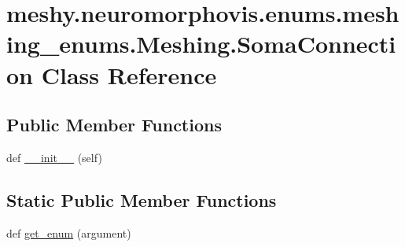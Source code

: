 \hypertarget{classmeshy_1_1neuromorphovis_1_1enums_1_1meshing__enums_1_1Meshing_1_1SomaConnection}{}\section{meshy.\+neuromorphovis.\+enums.\+meshing\+\_\+enums.\+Meshing.\+Soma\+Connection Class Reference}
\label{classmeshy_1_1neuromorphovis_1_1enums_1_1meshing__enums_1_1Meshing_1_1SomaConnection}


 


\subsection*{Public Member Functions}
\begin{DoxyCompactItemize}
\item 
def \hyperlink{classmeshy_1_1neuromorphovis_1_1enums_1_1meshing__enums_1_1Meshing_1_1SomaConnection_afaf187acb838fdda4a038bfe232c79a8}{\+\_\+\+\_\+init\+\_\+\+\_\+} (self)\hypertarget{classmeshy_1_1neuromorphovis_1_1enums_1_1meshing__enums_1_1Meshing_1_1SomaConnection_afaf187acb838fdda4a038bfe232c79a8}{}\label{classmeshy_1_1neuromorphovis_1_1enums_1_1meshing__enums_1_1Meshing_1_1SomaConnection_afaf187acb838fdda4a038bfe232c79a8}

\end{DoxyCompactItemize}
\subsection*{Static Public Member Functions}
\begin{DoxyCompactItemize}
\item 
def \hyperlink{classmeshy_1_1neuromorphovis_1_1enums_1_1meshing__enums_1_1Meshing_1_1SomaConnection_a67eff0d43c66f45456a6e58d19f7c88f}{get\+\_\+enum} (argument)\hypertarget{classmeshy_1_1neuromorphovis_1_1enums_1_1meshing__enums_1_1Meshing_1_1SomaConnection_a67eff0d43c66f45456a6e58d19f7c88f}{}\label{classmeshy_1_1neuromorphovis_1_1enums_1_1meshing__enums_1_1Meshing_1_1SomaConnection_a67eff0d43c66f45456a6e58d19f7c88f}

\end{DoxyCompactItemize}

